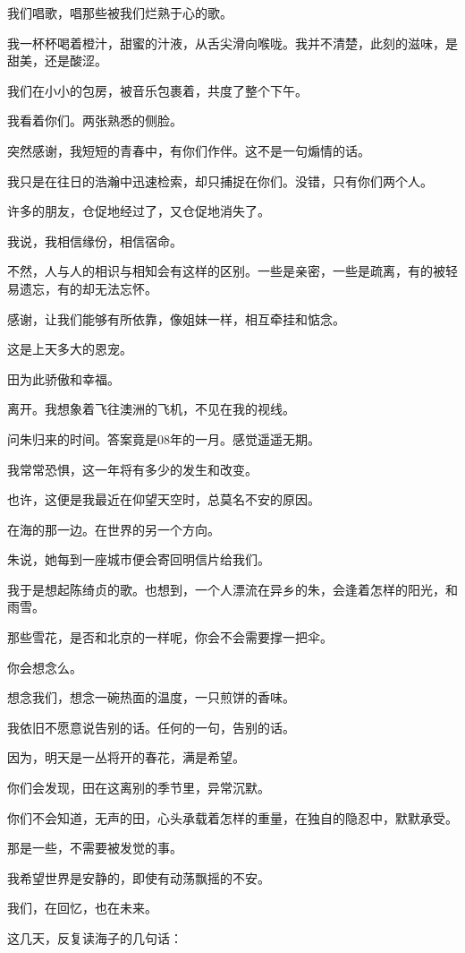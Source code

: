 \documentclass[12pt,a4paper]{article}
\def\blankrev{\vspace{1ex}}									%
\begin{document}
		\blankrev
		我们唱歌，唱那些被我们烂熟于心的歌。\par
		我一杯杯喝着橙汁，甜蜜的汁液，从舌尖滑向喉咙。我并不清楚，此刻的滋味，是甜美，还是酸涩。\par
		我们在小小的包房，被音乐包裹着，共度了整个下午。\par
		我看着你们。两张熟悉的侧脸。\par
		突然感谢，我短短的青春中，有你们作伴。这不是一句煽情的话。\par
		我只是在往日的浩瀚中迅速检索，却只捕捉在你们。没错，只有你们两个人。\par
		许多的朋友，仓促地经过了，又仓促地消失了。\par
		我说，我相信缘份，相信宿命。\par
		不然，人与人的相识与相知会有这样的区别。一些是亲密，一些是疏离，有的被轻易遗忘，有的却无法忘怀。\par
		感谢，让我们能够有所依靠，像姐妹一样，相互牵挂和惦念。\par
		这是上天多大的恩宠。\par
		田为此骄傲和幸福。

		\blankrev
		离开。我想象着飞往澳洲的飞机，不见在我的视线。\par
		问朱归来的时间。答案竟是08年的一月。感觉遥遥无期。\par
		我常常恐惧，这一年将有多少的发生和改变。\par
		也许，这便是我最近在仰望天空时，总莫名不安的原因。\par
		在海的那一边。在世界的另一个方向。\par
		朱说，她每到一座城市便会寄回明信片给我们。\par
		我于是想起陈绮贞的歌。也想到，一个人漂流在异乡的朱，会逢着怎样的阳光，和雨雪。\par
		那些雪花，是否和北京的一样呢，你会不会需要撑一把伞。\par
		你会想念么。\par
		想念我们，想念一碗热面的温度，一只煎饼的香味。

		\blankrev
		我依旧不愿意说告别的话。任何的一句，告别的话。\par
		因为，明天是一丛将开的春花，满是希望。\par
		你们会发现，田在这离别的季节里，异常沉默。\par
		你们不会知道，无声的田，心头承载着怎样的重量，在独自的隐忍中，默默承受。\par
		那是一些，不需要被发觉的事。\par
		我希望世界是安静的，即使有动荡飘摇的不安。\par
		我们，在回忆，也在未来。\par
		这几天，反复读海子的几句话：
\end{document}
